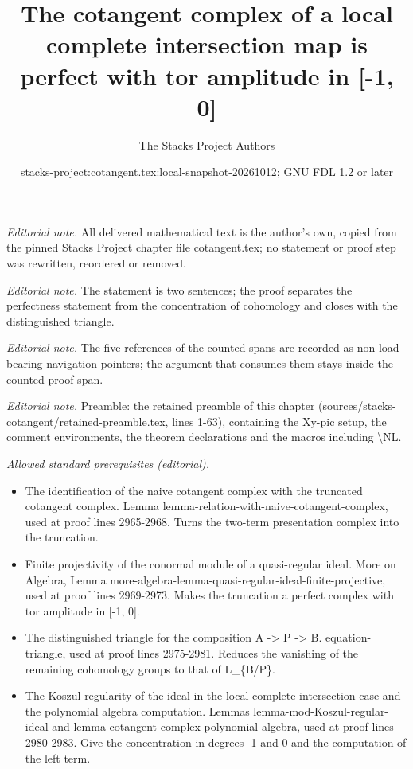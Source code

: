 \documentclass[10pt,a4paper]{amsart}
\title{The cotangent complex of a local complete intersection map is perfect with tor amplitude in [-1, 0]}
\author{The Stacks Project Authors}
\date{stacks-project:cotangent.tex:local-snapshot-20261012; GNU FDL 1.2 or later}
\theoremstyle{plain}
\theoremstyle{definition}
\theoremstyle{remark}
\numberwithin{equation}{subsection}
\begin{document}
\maketitle
\setcounter{subsection}{1}
\noindent\textit{Editorial note.} All delivered mathematical text is the author's own, copied from the pinned Stacks Project chapter file cotangent.tex; no statement or proof step was rewritten, reordered or removed.\par\medskip
\noindent\textit{Editorial note.} The statement is two sentences; the proof separates the perfectness statement from the concentration of cohomology and closes with the distinguished triangle.\par\medskip
\noindent\textit{Editorial note.} The five references of the counted spans are recorded as non-load-bearing navigation pointers; the argument that consumes them stays inside the counted proof span.\par\medskip
\noindent\textit{Editorial note.} Preamble: the retained preamble of this chapter (sources/stacks-cotangent/retained-preamble.tex, lines 1-63), containing the Xy-pic setup, the comment environments, the theorem declarations and the macros including \textbackslash{}NL.\par\medskip
\noindent\textit{Allowed standard prerequisites (editorial).}\begin{itemize}
\item The identification of the naive cotangent complex with the truncated cotangent complex. Lemma lemma-relation-with-naive-cotangent-complex, used at proof lines 2965-2968. Turns the two-term presentation complex into the truncation.
\item Finite projectivity of the conormal module of a quasi-regular ideal. More on Algebra, Lemma more-algebra-lemma-quasi-regular-ideal-finite-projective, used at proof lines 2969-2973. Makes the truncation a perfect complex with tor amplitude in [-1, 0].
\item The distinguished triangle for the composition A -> P -> B. equation-triangle, used at proof lines 2975-2981. Reduces the vanishing of the remaining cohomology groups to that of L\_\{B/P\}.
\item The Koszul regularity of the ideal in the local complete intersection case and the polynomial algebra computation. Lemmas lemma-mod-Koszul-regular-ideal and lemma-cotangent-complex-polynomial-algebra, used at proof lines 2980-2983. Give the concentration in degrees -1 and 0 and the computation of the left term.
\end{itemize}\medskip
\end{document}

